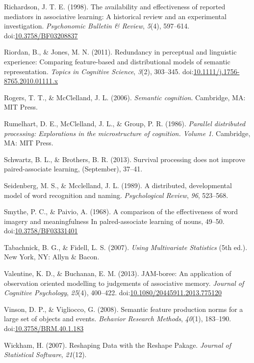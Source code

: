 \documentclass[english,man]{apa6}
\theoremstyle{definition}
\theoremstyle{definition}
\theoremstyle{definition}
\theoremstyle{remark}
\begin{document}
\hypertarget{ref-Richardson1998}{}
Richardson, J. T. E. (1998). The availability and effectiveness of
reported mediators in associative learning: A historical review and an
experimental investigation. \emph{Psychonomic Bulletin \& Review},
\emph{5}(4), 597--614.
doi:\href{https://doi.org/10.3758/BF03208837}{10.3758/BF03208837}

\hypertarget{ref-Riordan2011}{}
Riordan, B., \& Jones, M. N. (2011). Redundancy in perceptual and
linguistic experience: Comparing feature-based and distributional models
of semantic representation. \emph{Topics in Cognitive Science},
\emph{3}(2), 303--345.
doi:\href{https://doi.org/10.1111/j.1756-8765.2010.01111.x}{10.1111/j.1756-8765.2010.01111.x}

\hypertarget{ref-Rogers2006}{}
Rogers, T. T., \& McClelland, J. L. (2006). \emph{Semantic cognition}.
Cambridge, MA: MIT Press.

\hypertarget{ref-Rumelhart1986}{}
Rumelhart, D. E., McClelland, J. L., \& Group, P. R. (1986).
\emph{Parallel distributed processing: Explorations in the
microstructure of cognition. Volume 1}. Cambridge, MA: MIT Press.

\hypertarget{ref-Schwartz2013}{}
Schwartz, B. L., \& Brothers, B. R. (2013). Survival processing does not
improve paired-associate learning, (September), 37--41.

\hypertarget{ref-Seidenberg1989}{}
Seidenberg, M. S., \& Mcclelland, J. L. (1989). A distributed,
developmental model of word recognition and naming. \emph{Psychological
Review}, \emph{96}, 523--568.

\hypertarget{ref-Smythe1968}{}
Smythe, P. C., \& Paivio, A. (1968). A comparison of the effectiveness
of word imagery and meaningfulness In palred-associate learning of
nouns, 49--50.
doi:\href{https://doi.org/10.3758/BF03331401}{10.3758/BF03331401}

\hypertarget{ref-Tabachnick2007}{}
Tabachnick, B. G., \& Fidell, L. S. (2007). \emph{Using Multivariate
Statistics} (5th ed.). New York, NY: Allyn \& Bacon.

\hypertarget{ref-Valentine2013}{}
Valentine, K. D., \& Buchanan, E. M. (2013). JAM-boree: An application
of observation oriented modelling to judgements of associative memory.
\emph{Journal of Cognitive Psychology}, \emph{25}(4), 400--422.
doi:\href{https://doi.org/10.1080/20445911.2013.775120}{10.1080/20445911.2013.775120}

\hypertarget{ref-Vinson2008}{}
Vinson, D. P., \& Vigliocco, G. (2008). Semantic feature production
norms for a large set of objects and events. \emph{Behavior Research
Methods}, \emph{40}(1), 183--190.
doi:\href{https://doi.org/10.3758/BRM.40.1.183}{10.3758/BRM.40.1.183}

\hypertarget{ref-Wickham2007}{}
Wickham, H. (2007). Reshaping Data with the Reshape Pakage.
\emph{Journal of Statistical Software}, \emph{21}(12).
\end{document}
